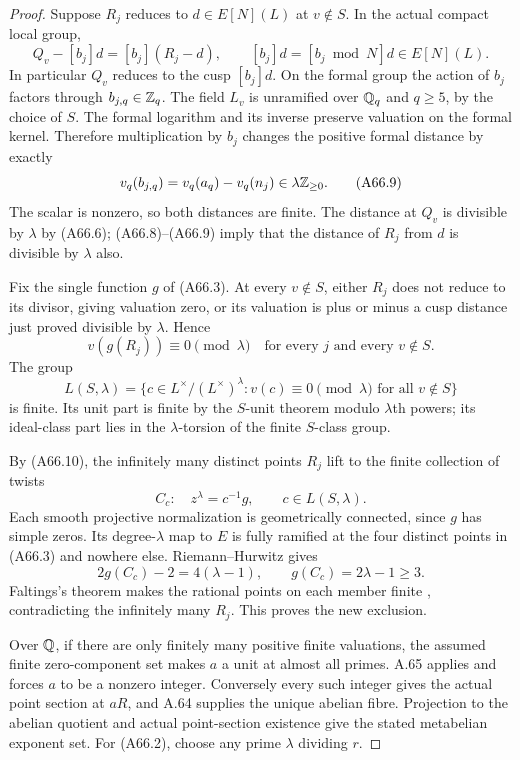 \begin{proof}
Suppose $R_j$ reduces to $d\in E[N](L)$
at $v\notin S$. In the actual compact
local group,
\[
 Q_v-[b_j]d=[b_j](R_j-d),\qquad
 [b_j]d=[b_j\bmod N]d\in E[N](L).
 \tag{A66.8}
\]
In particular $Q_v$ reduces to the cusp
$[b_j]d$. On the formal group the action
of $b_j$ factors through $b_{j,q}\in\mathbb Z_q$.
The field $L_v$ is unramified over
$\mathbb Q_q$ and $q\ge5$, by the choice of
$S$. The formal logarithm and its inverse
preserve valuation on the formal kernel.
Therefore multiplication by $b_j$ changes
the positive formal distance by exactly
\[
 v_q(b_{j,q})
    =v_q(a_q)-v_q(n_j)
    \in\lambda\mathbb Z_{\ge0}.
 \tag{A66.9}
\]
The scalar is nonzero, so both distances
are finite. The distance at $Q_v$ is
divisible by $\lambda$ by (A66.6);
(A66.8)--(A66.9) imply that the distance
of $R_j$ from $d$ is divisible by
$\lambda$ also.

Fix the single function $g$ of (A66.3).
At every $v\notin S$, either $R_j$
does not reduce to its divisor, giving
valuation zero, or its valuation is
plus or minus a cusp distance just
proved divisible by $\lambda$. Hence
\[
 v(g(R_j))\equiv0\pmod\lambda
           \quad\text{for every }j
           \text{ and every }v\notin S.
 \tag{A66.10}
\]
The group
\[
 L(S,\lambda)=
 \{c\in L^\times/(L^\times)^\lambda:
          v(c)\equiv0\pmod\lambda
          \text{ for all }v\notin S\}
 \tag{A66.11}
\]
is finite. Its unit part is finite by
the $S$-unit theorem modulo
$\lambda$th powers; its ideal-class
part lies in the $\lambda$-torsion
of the finite $S$-class group.

By (A66.10), the infinitely many
distinct points $R_j$ lift to the
finite collection of twists
\[
 C_c:\quad z^\lambda=c^{-1}g,
                    \qquad c\in L(S,\lambda).
 \tag{A66.12}
\]
Each smooth projective normalization
is geometrically connected, since $g$
has simple zeros. Its degree-$\lambda$
map to $E$ is fully ramified at the
four distinct points in (A66.3) and
nowhere else. Riemann--Hurwitz gives
\[
 2g(C_c)-2=4(\lambda-1),
                  \qquad g(C_c)=2\lambda-1\ge3.
 \tag{A66.13}
\]
Faltings's theorem makes the rational
points on each member finite
\citep[Satz~7, p.~365, and the correction]{AMFaltings1983,AMFaltings1984Erratum},
contradicting the infinitely many
$R_j$. This proves the new exclusion.

Over $\mathbb Q$, if there are only finitely
many positive finite valuations,
the assumed finite zero-component set
makes $a$ a unit at almost all primes.
A.65 applies and forces $a$ to be a
nonzero integer. Conversely every
such integer gives the actual point
section at $aR$, and A.64 supplies
the unique abelian fibre. Projection
to the abelian quotient and actual
point-section existence give the
stated metabelian exponent set.
For (A66.2), choose any prime
$\lambda$ dividing $r$.
\end{proof}

